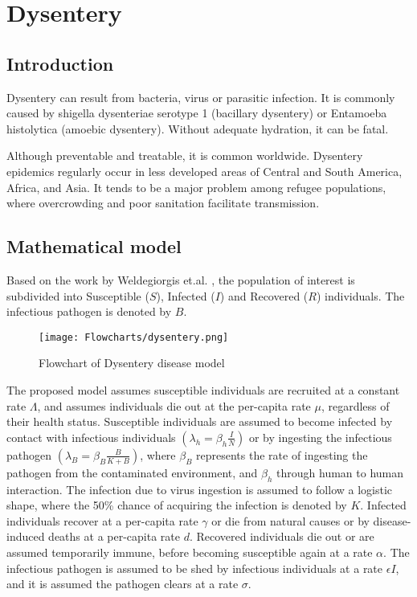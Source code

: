 \documentclass{book}\usepackage[]{graphicx}\usepackage[]{color}
\begin{document}
\section{Dysentery}

\subsection*{Introduction}
Dysentery can result from bacteria, virus or parasitic infection. It is commonly caused by shigella dysenteriae serotype 1 (bacillary dysentery) or Entamoeba histolytica (amoebic dysentery). Without adequate hydration, it can be fatal.

Although preventable and treatable, it is common worldwide. Dysentery epidemics regularly occur in less developed areas of Central and South America, Africa, and Asia. It tends to be a major problem among refugee populations, where overcrowding and poor sanitation facilitate transmission.

\subsection*{Mathematical model}

Based on the work by Weldegiorgis et.al. \cite{berhe2019parameter}, the population of interest is subdivided into Susceptible ($S$), Infected ($I$) and Recovered ($R$) individuals. The infectious pathogen is denoted by $B$.

\begin{figure}[H]
    \centering
    \texttt{[image: Flowcharts/dysentery.png]}
    \caption{Flowchart of Dysentery disease model}
    \label{fig:dysentery_flow}
\end{figure}

The proposed model assumes susceptible individuals are recruited at a constant rate $\Lambda$, and assumes individuals die out at the per-capita rate $\mu$, regardless of their health status. 
%
Susceptible individuals are assumed to become infected by contact with infectious individuals $\left(\lambda_h=\beta_{h}\frac{I}{N}\right)$ or by ingesting the infectious pathogen $\left(\lambda_B=\beta_{B}\frac{B}{K+B} \right)$, where $\beta_B$ represents the rate of ingesting the pathogen from the contaminated environment, and $\beta_h$ through human to human interaction.
%
The infection due to virus ingestion is assumed to follow a logistic shape, where the 50\% chance of acquiring the infection is denoted by $K$.
%
Infected individuals recover at a per-capita rate $\gamma$ or die from natural causes or by disease-induced deaths at a per-capita rate $d$.
%
Recovered individuals die out or are assumed temporarily immune, before becoming susceptible again at a rate $\alpha$.
%
The infectious pathogen is assumed to be shed by infectious individuals at a rate $\epsilon I$, and it is assumed the pathogen clears at a rate $\sigma$.
\end{document}
